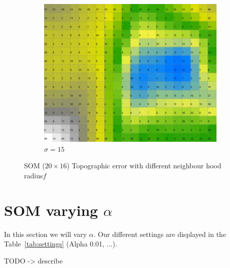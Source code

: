 \documentclass{acm_proc_article-sp}
\begin{document}
\begin{figure}
\begin{subfigure}[b]{0.30\linewidth}
        \includegraphics[width=\linewidth]{img/wine-newmid-activity-histogram-sigma-15}
        \caption{$\sigma=15$}
    \end{subfigure}
    \caption{SOM ($20\times16$) Topographic error with different neighbour hood radius$f$}
    \label{fig:wine-newmid-activity-histogram-sigma}
\end{figure}

\section{SOM varying $\alpha$}

In this section we will vary $\alpha$.  Our different settings are displayed in the Table~\ref{tab:settings} (Alpha 0.01, ...).

TODO -> describe
\end{document}
